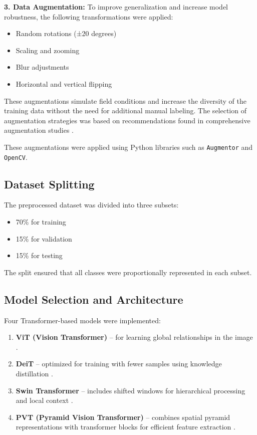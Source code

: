 \documentclass[preprint,12pt]{elsarticle}
\begin{document}
\textbf{3. Data Augmentation:} To improve generalization and increase model robustness, the following transformations were applied:
\begin{itemize}
  \item Random rotations (±20 degrees)
  \item Scaling and zooming
  \item Blur adjustments
  \item Horizontal and vertical flipping
\end{itemize}
These augmentations simulate field conditions and increase the diversity of the training data without the need for additional manual labeling. The selection of augmentation strategies was based on recommendations found in comprehensive augmentation studies \cite{Shorten2019Survey,Buslaev2020Albumentations}.

These augmentations were applied using Python libraries such as \texttt{Augmentor} and \texttt{OpenCV}.

\subsection{Dataset Splitting}

The preprocessed dataset was divided into three subsets:
\begin{itemize}
  \item 70\% for training
  \item 15\% for validation
  \item 15\% for testing
\end{itemize}

The split ensured that all classes were proportionally represented in each subset.

\subsection{Model Selection and Architecture}

Four Transformer-based models were implemented:
\begin{enumerate}
  \item \textbf{ViT (Vision Transformer)} – for learning global relationships in the image \cite{Dosovitskiy2020AnII}.
  \item \textbf{DeiT} – optimized for training with fewer samples using knowledge distillation \cite{Touvron2021TrainingDI}.
  \item \textbf{Swin Transformer} – includes shifted windows for hierarchical processing and local context \cite{Liu2021SwinTH}.
  \item \textbf{PVT (Pyramid Vision Transformer)} – combines spatial pyramid representations with transformer blocks for efficient feature extraction \cite{Wang2021PyramidVT}.
\end{enumerate}
\end{document}
